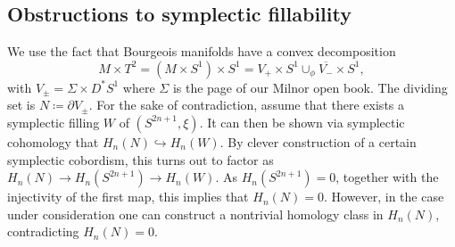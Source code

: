 \documentclass{amsart}
\begin{document}
\subsection*{Obstructions to symplectic fillability}
We use the fact that Bourgeois manifolds have a convex decomposition
\[
    M \times T^2 = (M \times S^1) \times S^1 = V_+ \times S^1 \cup_\phi \overline{V_-} \times S^1,  
\]
with $V_{\pm} = \Sigma \times D^*S^1$ where $\Sigma$ is the page of our Milnor open book.
The dividing set is $N \coloneqq \partial V_{\pm}$.
For the sake of contradiction, assume that there exists a symplectic filling $W$ of $(S^{2n+1}, \xi)$.
It can then be shown via symplectic cohomology that $H_n(N) \hookrightarrow H_n(W)$.
By clever construction of a certain symplectic cobordism, this turns out to factor
as $H_n(N) \to H_n(S^{2n+1}) \to H_n(W)$.
As $H_n(S^{2n+1}) = 0$, together with the injectivity of the first map,
this implies that $H_n(N) = 0$.
However, in the case under consideration one can construct a nontrivial homology class
in $H_n(N)$, contradicting $H_n(N) = 0$.



\end{document}
